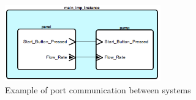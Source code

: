 \begin{figure}[ht]%
    \begin{center}
    	\includegraphics[width=0.6\textwidth]{figures/port-communication.png}
    	\caption{Example of port communication between systems}
    \end{center}
    \label{figure:port_communication}
\end{figure}

